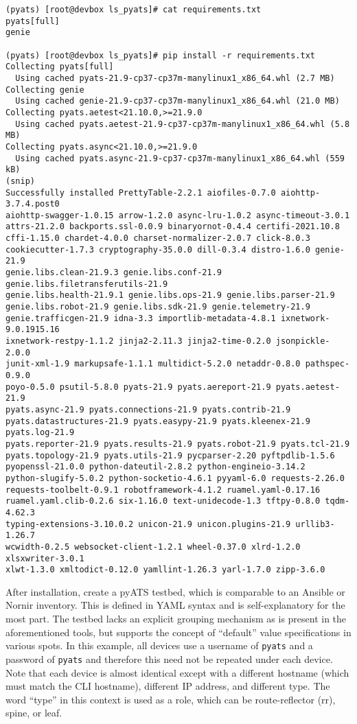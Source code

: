 \begin{verbatim}
(pyats) [root@devbox ls_pyats]# cat requirements.txt
pyats[full]
genie

(pyats) [root@devbox ls_pyats]# pip install -r requirements.txt
Collecting pyats[full]
  Using cached pyats-21.9-cp37-cp37m-manylinux1_x86_64.whl (2.7 MB)
Collecting genie
  Using cached genie-21.9-cp37-cp37m-manylinux1_x86_64.whl (21.0 MB)
Collecting pyats.aetest<21.10.0,>=21.9.0
  Using cached pyats.aetest-21.9-cp37-cp37m-manylinux1_x86_64.whl (5.8 MB)
Collecting pyats.async<21.10.0,>=21.9.0
  Using cached pyats.async-21.9-cp37-cp37m-manylinux1_x86_64.whl (559 kB)
(snip)
Successfully installed PrettyTable-2.2.1 aiofiles-0.7.0 aiohttp-3.7.4.post0
aiohttp-swagger-1.0.15 arrow-1.2.0 async-lru-1.0.2 async-timeout-3.0.1
attrs-21.2.0 backports.ssl-0.0.9 binaryornot-0.4.4 certifi-2021.10.8
cffi-1.15.0 chardet-4.0.0 charset-normalizer-2.0.7 click-8.0.3
cookiecutter-1.7.3 cryptography-35.0.0 dill-0.3.4 distro-1.6.0 genie-21.9
genie.libs.clean-21.9.3 genie.libs.conf-21.9 genie.libs.filetransferutils-21.9
genie.libs.health-21.9.1 genie.libs.ops-21.9 genie.libs.parser-21.9
genie.libs.robot-21.9 genie.libs.sdk-21.9 genie.telemetry-21.9
genie.trafficgen-21.9 idna-3.3 importlib-metadata-4.8.1 ixnetwork-9.0.1915.16
ixnetwork-restpy-1.1.2 jinja2-2.11.3 jinja2-time-0.2.0 jsonpickle-2.0.0
junit-xml-1.9 markupsafe-1.1.1 multidict-5.2.0 netaddr-0.8.0 pathspec-0.9.0
poyo-0.5.0 psutil-5.8.0 pyats-21.9 pyats.aereport-21.9 pyats.aetest-21.9
pyats.async-21.9 pyats.connections-21.9 pyats.contrib-21.9
pyats.datastructures-21.9 pyats.easypy-21.9 pyats.kleenex-21.9 pyats.log-21.9
pyats.reporter-21.9 pyats.results-21.9 pyats.robot-21.9 pyats.tcl-21.9
pyats.topology-21.9 pyats.utils-21.9 pycparser-2.20 pyftpdlib-1.5.6
pyopenssl-21.0.0 python-dateutil-2.8.2 python-engineio-3.14.2
python-slugify-5.0.2 python-socketio-4.6.1 pyyaml-6.0 requests-2.26.0
requests-toolbelt-0.9.1 robotframework-4.1.2 ruamel.yaml-0.17.16
ruamel.yaml.clib-0.2.6 six-1.16.0 text-unidecode-1.3 tftpy-0.8.0 tqdm-4.62.3
typing-extensions-3.10.0.2 unicon-21.9 unicon.plugins-21.9 urllib3-1.26.7
wcwidth-0.2.5 websocket-client-1.2.1 wheel-0.37.0 xlrd-1.2.0 xlsxwriter-3.0.1
xlwt-1.3.0 xmltodict-0.12.0 yamllint-1.26.3 yarl-1.7.0 zipp-3.6.0
\end{verbatim}

After installation, create a pyATS testbed, which is comparable to an Ansible
or Nornir inventory. This is defined in YAML syntax and is self-explanatory
for the most part. The testbed lacks an explicit grouping mechanism as is
present in the aforementioned tools, but supports the concept of ``default''
value specifications in various spots. In this example, all devices use
a username of \verb|pyats| and a password of \verb|pyats| and therefore this
need not be repeated under each device. Note that each device is almost
identical except with a different hostname (which must match the CLI hostname),
different IP address, and different type. The word ``type'' in this context
is used as a role, which can be route-reflector (rr), spine, or leaf.

